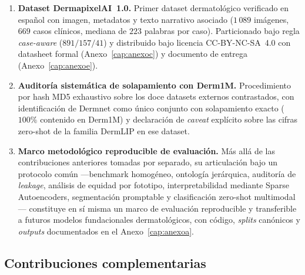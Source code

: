 \begin{enumerate}
\item \textbf{Dataset DermapixelAI~1.0.} Primer dataset
dermatológico verificado en español con imagen, metadatos y texto
narrativo asociado ($1\,089$ imágenes, $669$ casos clínicos,
mediana de $223$ palabras por caso). Particionado bajo regla
\emph{case-aware} ($891 / 157 / 41$) y distribuido bajo
licencia CC-BY-NC-SA~4.0 con datasheet formal
(Anexo~\ref{cap:anexoc}) y documento de entrega
(Anexo~\ref{cap:anexoe}).

\item \textbf{Auditoría sistemática de solapamiento con Derm1M.}
Procedimiento por hash MD5 exhaustivo sobre los doce datasets
externos contrastados, con identificación de Dermnet como único
conjunto con solapamiento exacto ($100\%$ contenido en Derm1M) y
declaración de \emph{caveat} explícito sobre las cifras zero-shot de
la familia DermLIP en ese dataset.

\item \textbf{Marco metodológico reproducible de evaluación.} Más allá
de las contribuciones anteriores tomadas por separado, su articulación
bajo un protocolo común ---benchmark homogéneo, ontología jerárquica,
auditoría de \emph{leakage}, análisis de equidad por fototipo,
interpretabilidad mediante Sparse Autoencoders, segmentación
promptable y clasificación zero-shot multimodal--- constituye en sí
misma un marco de evaluación reproducible y transferible a futuros
modelos fundacionales dermatológicos, con código, \emph{splits}
canónicos y \emph{outputs} documentados en el
Anexo~\ref{cap:anexoa}.
\end{enumerate}

\subsection{Contribuciones complementarias}
\label{sec:contrib-anexos}

